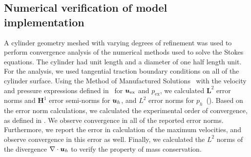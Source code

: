 \documentclass{WileyMSP-template}
\begin{document}
\subsection{Numerical verification of model implementation}\label{subsec:numerical_verification}
A cylinder geometry meshed with varying degrees of refinement was used to
perform convergence analysis of the numerical methods used to solve the Stokes equations.
The cylinder had unit length and a diameter of one half length unit.
For the analysis, we used tangential traction boundary conditions on all
of the cylinder surface. Using the Method of Manufactured Solutions~\cite{Roache2001CodeSolutions}
with the velocity and pressure expressions defined in~
for $\bm{u}_{\mathrm{ex}}$ and $p_{\mathrm{ex}}$, we calculated $\mathbf{L}^2$
error norms and $\mathbf{H}^1$ error semi-norms for $\bm{u}_h$,
and $L^2$ error norms for $p_h$~().
Based on the error norm calculations,
we calculated the experimental order of convergence,
as defined in .
We observe convergence in all of the reported error norms. Furthermore,
we report the error in calculation of the maximum velocities, and observe
convergence in this error as well. Finally, we calculated the $L^2$ norms of
the divergence $\nabla\cdot\bm{u}_h$ to verify the property of mass conservation.
\end{document}
